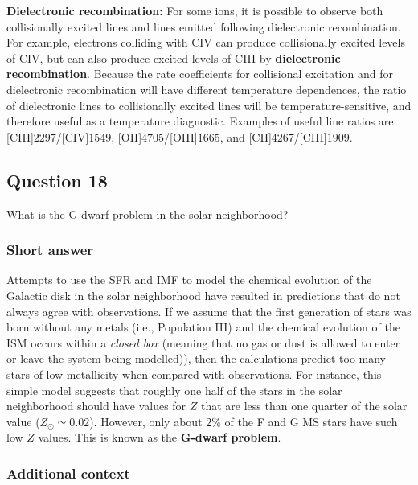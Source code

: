 \documentclass[a4paper,10pt]{article}
\begin{document}
{\noindent}\textbf{Dielectronic recombination:} For some ions, it is possible to observe both collisionally excited lines and lines emitted following dielectronic recombination. For example, electrons colliding with CIV can produce collisionally excited levels of CIV, but can also produce excited levels of CIII by \textbf{dielectronic recombination}. Because the rate coefficients for collisional excitation and for dielectronic recombination will have different temperature dependences, the ratio of dielectronic lines to collisionally excited lines will be temperature-sensitive, and therefore useful as a temperature diagnostic. Examples of useful line ratios are [CIII]$2297$/[CIV]$1549$, [OII]$4705$/[OIII]$1665$, and [CII]$4267$/[CIII]$1909$.



\newpage
\subsection{Question 18}

What is the G-dwarf problem in the solar neighborhood?

\subsubsection{Short answer}

Attempts to use the SFR and IMF to model the chemical evolution of the Galactic disk in the solar neighborhood have resulted in predictions that do not always agree with observations. If we assume that the first generation of stars was born without any metals (i.e., Population III) and the chemical evolution of the ISM occurs within a \textit{closed box} (meaning that no gas or dust is allowed to enter or leave the system being modelled)), then the calculations predict too many stars of low metallicity when compared with observations. For instance, this simple model suggests that roughly one half of the stars in the solar neighborhood should have values for $Z$ that are less than one quarter of the solar value ($Z_\odot\simeq0.02$). However, only about $2\%$ of the F and G MS stars have such low $Z$ values. This is known as the \textbf{G-dwarf problem}.

\subsubsection{Additional context}
\end{document}
